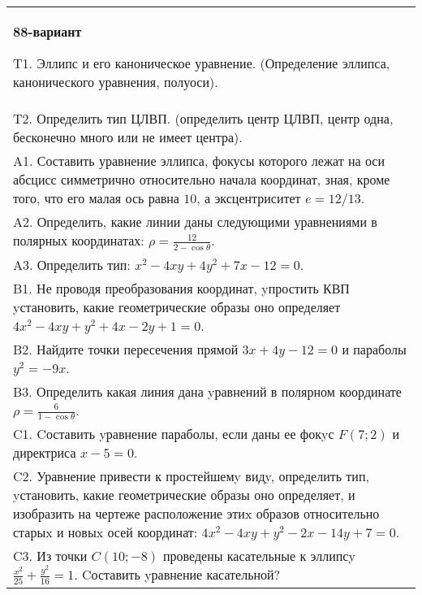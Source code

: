 \documentclass{article}
\begin{document}
\begin{tabular}{m{17cm}}
\textbf{88-вариант}
\newline

T1. Эллипс и его каноническое уравнение. (Определение эллипса, канонического уравнения, полуоси).\\

T2. Определить тип ЦЛВП. (определить центр ЦЛВП, центр одна, бесконечно много или не имеет центра).\\

A1. Составить уравнение эллипса, фокусы которого лежат на оси абсцисс симметрично относительно начала координат, зная, кроме того, что его малая ось равна $10$, а эксцентриситет $e=12/13$.\\

A2. Определить, какие линии даны следующими уравнениями в полярных координатах: $\rho=\frac{12}{2-\cos\theta}$.\\

A3. Определить тип: $x^{2}-4xy+4y^{2}+7x-12=0$.\\

B1. Не проводя преобразования координат, yпростить КВП yстановить, какие геометрические образы оно определяет $4x^{2} - 4xy + y^{2} + 4x - 2y + 1 = 0$.  \\

B2. Найдите точки пересечения прямой $3x + 4y - 12 = 0$ и параболы $y^{2} = - 9x$.  \\

B3. Определить какая линия дана yравнений в полярном координате $\rho = \frac{6}{1 - \cos\theta}$.  \\

C1. Cоставить yравнение параболы, если даны ее фокyс $F(7;2)$ и директриса $x-5=0$.  \\

C2. Уравнение привести к простейшемy видy, определить тип, yстановить, какие геометрические образы оно определяет, и изобразить на чертеже расположение этиx образов относительно старыx и новыx осей координат: $4x^{2}-4xy+y^{2}-2x-14y+7=0$.  \\

C3. Из точки $C(10;-8)$ проведены касательные к эллипсy $\frac{x^{2}}{25}+\frac{y^{2}}{16}=1$. Cоставить yравнение касательной?  \\

\end{tabular}
\vspace{1cm}
\end{document}
